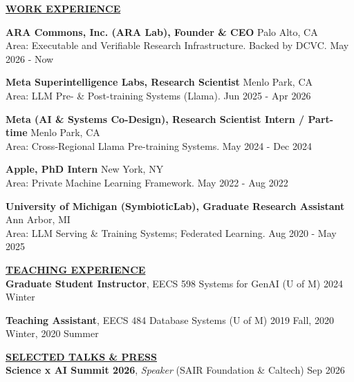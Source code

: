 \documentclass{article}
\begin{document}
 \vspace{-1em}

\noindent \textbf{\underline{WORK EXPERIENCE}} 

\noindent
\textbf{ARA Commons, Inc. (ARA Lab), Founder \& CEO} \hfill Palo Alto, CA
\\
\quad Area: Executable and Verifiable Research Infrastructure. Backed by DCVC.    \hfill May 2026 - Now

\noindent
\textbf{Meta Superintelligence Labs, Research Scientist} \hfill Menlo Park, CA
\\
\quad Area: LLM Pre- \& Post-training Systems (Llama).    \hfill Jun 2025 - Apr 2026

\noindent
\textbf{Meta (AI \& Systems Co-Design), Research Scientist Intern / Part-time} \hfill Menlo Park, CA
\\
\quad Area: Cross-Regional Llama Pre-training Systems.    \hfill May 2024 - Dec 2024

\noindent 
\textbf{Apple, PhD Intern} \hfill New York, NY
\\
\quad Area: Private Machine Learning Framework.    \hfill May 2022 - Aug 2022

\noindent 
\textbf{University of Michigan (SymbioticLab), Graduate Research Assistant} \hfill Ann Arbor, MI
\\
\quad Area: LLM Serving \& Training Systems; Federated Learning.    \hfill Aug 2020 - May 2025



\noindent \textbf{\underline{TEACHING EXPERIENCE}} \\ 
\noindent \textbf{Graduate Student Instructor}, EECS 598 Systems for GenAI  (U of M) \hfill 2024 Winter

\noindent \textbf{Teaching Assistant}, EECS 484 Database Systems (U of M) \hfill 2019 Fall, 2020 Winter, 2020 Summer




\noindent \textbf{\underline{SELECTED TALKS \& PRESS}} \\
\noindent \textbf{Science x AI Summit 2026}, \textit{Speaker} (SAIR Foundation \& Caltech) \hfill Sep 2026
\end{document}
